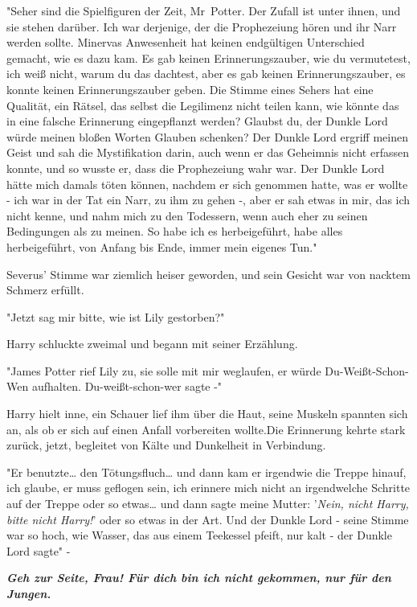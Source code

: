 {"Seher sind die Spielfiguren der Zeit, Mr~Potter. Der Zufall ist unter ihnen, und sie stehen darüber. Ich war derjenige, der die Prophezeiung hören und ihr Narr werden sollte. Minervas Anwesenheit hat keinen endgültigen Unterschied gemacht, wie es dazu kam. Es gab keinen Erinnerungszauber, wie du vermutetest, ich weiß nicht, warum du das dachtest, aber es gab keinen Erinnerungszauber, es konnte keinen Erinnerungszauber geben. Die Stimme eines Sehers hat eine Qualität, ein Rätsel, das selbst die Legilimenz nicht teilen kann, wie könnte das in eine falsche Erinnerung eingepflanzt werden? Glaubst du, der Dunkle Lord würde meinen bloßen Worten Glauben schenken? Der Dunkle Lord ergriff meinen Geist und sah die Mystifikation darin, auch wenn er das Geheimnis nicht erfassen konnte, und so wusste er, dass die Prophezeiung wahr war. Der Dunkle Lord hätte mich damals töten können, nachdem er sich genommen hatte, was er wollte - ich war in der Tat ein Narr, zu ihm zu gehen -, aber er sah etwas in mir, das ich nicht kenne, und nahm mich zu den Todessern, wenn auch eher zu seinen Bedingungen als zu meinen. So habe ich es herbeigeführt, habe alles herbeigeführt, von Anfang bis Ende, immer mein eigenes Tun."

Severus' Stimme war ziemlich heiser geworden, und sein Gesicht war von nacktem Schmerz erfüllt.

"Jetzt sag mir bitte, wie ist Lily gestorben?"

Harry schluckte zweimal und begann mit seiner Erzählung.

"James Potter rief Lily zu, sie solle mit mir weglaufen, er würde Du-Weißt-Schon-Wen aufhalten. Du-weißt-schon-wer sagte -"

Harry hielt inne, ein Schauer lief ihm über die Haut, seine Muskeln spannten sich an, als ob er sich auf einen Anfall vorbereiten wollte.Die Erinnerung kehrte stark zurück, jetzt, begleitet von Kälte und Dunkelheit in Verbindung.

"Er benutzte… den Tötungsfluch… und dann kam er irgendwie die Treppe hinauf, ich glaube, er muss geflogen sein, ich erinnere mich nicht an irgendwelche Schritte auf der Treppe oder so etwas… und dann sagte meine Mutter: '\emph{Nein, nicht Harry, bitte nicht Harry!}' oder so etwas in der Art. Und der Dunkle Lord - seine Stimme war so hoch, wie Wasser, das aus einem Teekessel pfeift, nur kalt - der Dunkle Lord sagte" -

\textbf{\emph{Geh zur Seite, Frau! Für dich bin ich nicht gekommen, nur für den Jungen.}}

}
